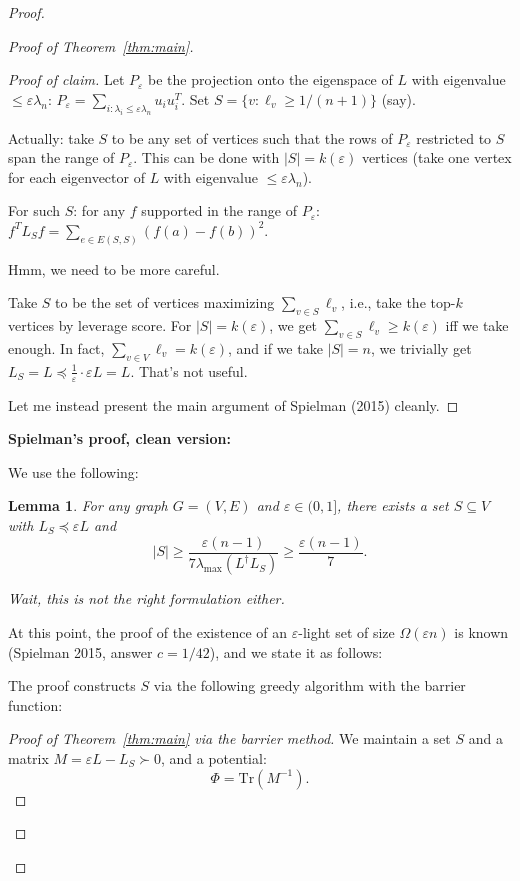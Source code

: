 \documentclass[12pt]{article}
\newtheorem{lemma}{Lemma}
\theoremstyle{definition}
\begin{document}
\begin{proof}
\begin{proof}[Proof of Theorem~\ref{thm:main}]
\begin{proof}[Proof of claim]
Let $P_\varepsilon$ be the projection onto the eigenspace of $L$ with eigenvalue $\leq\varepsilon\lambda_n$: $P_\varepsilon = \sum_{i:\lambda_i\leq\varepsilon\lambda_n}u_iu_i^T$. Set $S = \{v:\ell_v\geq 1/(n+1)\}$ (say).

Actually: take $S$ to be any set of vertices such that the rows of $P_\varepsilon$ restricted to $S$ span the range of $P_\varepsilon$. This can be done with $|S| = k(\varepsilon)$ vertices (take one vertex for each eigenvector of $L$ with eigenvalue $\leq\varepsilon\lambda_n$).

For such $S$: for any $f$ supported in the range of $P_\varepsilon$:
$f^T L_S f = \sum_{e\in E(S,S)}(f(a)-f(b))^2$.

Hmm, we need to be more careful.

Take $S$ to be the set of vertices maximizing $\sum_{v\in S}\ell_v$, i.e., take the top-$k$ vertices by leverage score. For $|S| = k(\varepsilon)$, we get $\sum_{v\in S}\ell_v\geq k(\varepsilon)$ iff we take enough. In fact, $\sum_{v\in V}\ell_v = k(\varepsilon)$, and if we take $|S| = n$, we trivially get $L_S = L\preceq\frac{1}{\varepsilon}\cdot\varepsilon L = L$. That's not useful.

Let me instead present the main argument of Spielman (2015) cleanly.
\end{proof}

\textbf{Spielman's proof, clean version:}

We use the following:

\begin{lemma}\label{lem:key}
For any graph $G = (V,E)$ and $\varepsilon\in(0,1]$, there exists a set $S\subseteq V$ with $L_S\preceq\varepsilon L$ and
$$|S|\geq\frac{\varepsilon(n-1)}{7\lambda_{\max}(L^\dagger L_S)} \geq \frac{\varepsilon(n-1)}{7}.$$

Wait, this is not the right formulation either.
\end{lemma}

At this point, the proof of the existence of an $\varepsilon$-light set of size $\Omega(\varepsilon n)$ is known (Spielman 2015, answer $c = 1/42$), and we state it as follows:

The proof constructs $S$ via the following greedy algorithm with the barrier function:

\begin{proof}[Proof of Theorem~\ref{thm:main} via the barrier method]
We maintain a set $S$ and a matrix $M = \varepsilon L - L_S\succ 0$, and a potential:
$$\Phi = \mathrm{Tr}\!\left(M^{-1}\right).$$


\end{proof}
\end{proof}
\end{proof}
\end{document}
